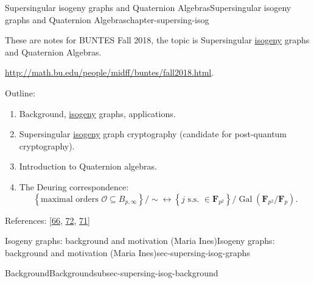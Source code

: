 \documentclass[oneside,10pt,]{book}
\numberwithin{equation}{section}
\newcommand{\FF}{\mathbf{F}}
\newcommand{\ints}{\mathcal{O}}
\newcommand{\Gal}[2]{\operatorname{Gal}(#1/#2)}
\begin{document}
%
%
\typeout{************************************************}
\typeout{************************************************}
%
\begin{chapterptx}{Supersingular isogeny graphs and Quaternion Algebras}{}{Supersingular isogeny graphs and Quaternion Algebras}{}{}{chapter-supersing-isog}
\begin{introduction}{}%
\hypertarget{p-782}{}%
These are notes for BUNTES Fall 2018, the topic is Supersingular \hyperref[def-supersing-isog-isog]{isogeny} graphs and Quaternion Algebras.%
\par
\hypertarget{p-783}{}%
\url{http://math.bu.edu/people/midff/buntes/fall2018.html}.%
\par
\hypertarget{p-784}{}%
Outline:\leavevmode%
\begin{enumerate}
\item\hypertarget{li-178}{}Background, \hyperref[def-supersing-isog-isog]{isogeny} graphs, applications.%
\item\hypertarget{li-179}{}Supersingular \hyperref[def-supersing-isog-isog]{isogeny} graph cryptography (candidate for post-quantum cryptography).%
\item\hypertarget{li-180}{}Introduction to Quaternion algebras.%
\item\hypertarget{li-181}{}The Deuring correspondence:%
\begin{equation*}
\left\{ \text{maximal orders }\ints \subseteq B_{p,\infty}\right\}/\sim \leftrightarrow \left\{ j \text{ s.s. }\in \FF_{p^2}\right\}/\Gal{\FF_{p^2}}{\FF_p}\text{.}
\end{equation*}
%
\end{enumerate}
%
\par
\hypertarget{p-785}{}%
References: [\hyperlink{bib-sutherland}{66}, \hyperlink{bib-voight-quat}{72}, \hyperlink{bib-velu}{71}]%
\end{introduction}%
%
%
\typeout{************************************************}
\typeout{************************************************}
%
\begin{sectionptx}{Isogeny graphs: background and motivation (Maria Ines)}{}{Isogeny graphs: background and motivation (Maria Ines)}{}{}{sec-supersing-isog-graphs}
%
%
\typeout{************************************************}
\typeout{************************************************}
%
\begin{subsectionptx}{Background}{}{Background}{}{}{subsec-supersing-isog-background}

\end{subsectionptx}
\end{sectionptx}
\end{chapterptx}
\end{document}
